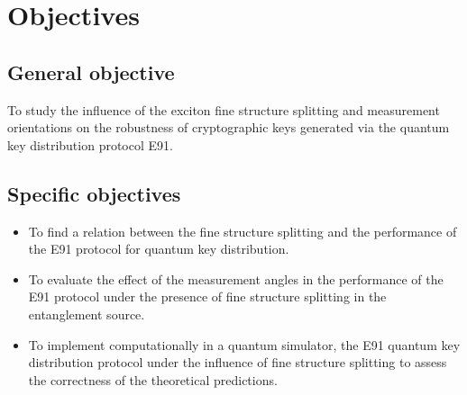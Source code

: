 \section{Objectives}

\subsection{General objective}

To study the influence of the exciton fine structure splitting and measurement orientations on the robustness of cryptographic keys generated via the quantum key distribution protocol E91.

\subsection{Specific objectives}

\begin{itemize}
    \item To find a relation between the fine structure splitting and the performance of the E91 protocol for quantum key distribution.
    
    \item To evaluate the effect of the measurement angles in the performance of the E91 protocol under the presence of fine structure splitting in the entanglement source.
    
    \item To implement computationally in a quantum simulator, the E91 quantum key distribution protocol under the influence of fine structure splitting to assess the correctness of the theoretical predictions.
\end{itemize}

